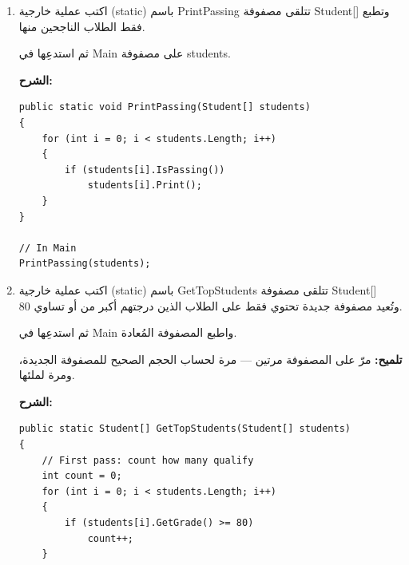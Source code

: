 \documentclass[14pt]{extarticle}
\begin{document}
\begin{enumerate}
\ifwithsols
\textbf{الشرح:}
\begin{english}
\begin{verbatim}
// In Main
for (int i = 0; i < students.Length; i++)
{
    if (!students[i].IsPassing())
        students[i].SetGrade(students[i].GetGrade() + 5);
}

for (int i = 0; i < students.Length; i++)
    students[i].Print();
\end{verbatim}
\end{english}
\clearpage
\fi

\item %

اكتب عملية خارجية (\textenglish{static}) باسم \textenglish{PrintPassing} تتلقى مصفوفة \textenglish{Student[]} وتطبع فقط الطلاب الناجحين منها.

ثم استدعِها في \textenglish{Main} على مصفوفة \textenglish{students}.

\ifwithsols
\textbf{الشرح:}
\begin{english}
\begin{verbatim}
public static void PrintPassing(Student[] students)
{
    for (int i = 0; i < students.Length; i++)
    {
        if (students[i].IsPassing())
            students[i].Print();
    }
}

// In Main
PrintPassing(students);
\end{verbatim}
\end{english}
\clearpage
\fi

\item %

اكتب عملية خارجية (\textenglish{static}) باسم \textenglish{GetTopStudents} تتلقى مصفوفة \textenglish{Student[]} وتُعيد مصفوفة جديدة تحتوي فقط على الطلاب الذين درجتهم أكبر من أو تساوي 80.

ثم استدعِها في \textenglish{Main} واطبع المصفوفة المُعادة.

\begin{boxNote}
\textbf{تلميح:} مرّ على المصفوفة مرتين — مرة لحساب الحجم الصحيح للمصفوفة الجديدة، ومرة لملئها.
\end{boxNote}

\ifwithsols
\textbf{الشرح:}
\begin{english}
\begin{verbatim}
public static Student[] GetTopStudents(Student[] students)
{
    // First pass: count how many qualify
    int count = 0;
    for (int i = 0; i < students.Length; i++)
    {
        if (students[i].GetGrade() >= 80)
            count++;
    }


\end{verbatim}
\end{english}
\end{enumerate}
\end{document}
